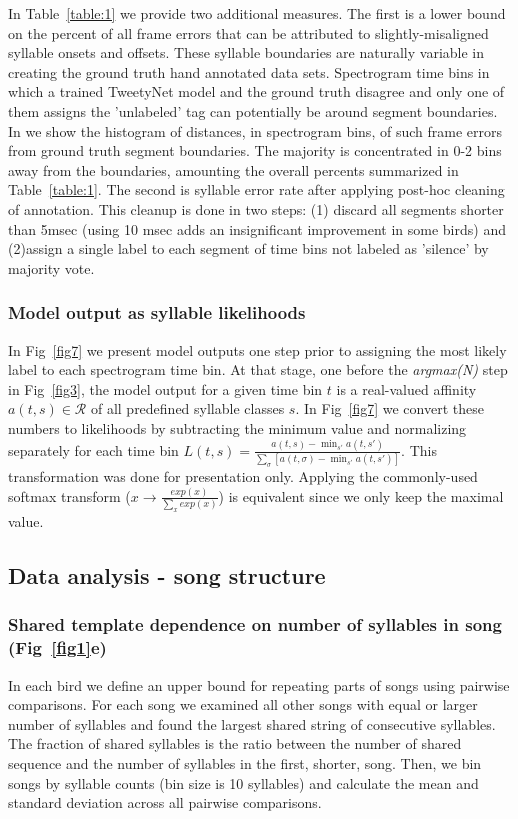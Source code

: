\documentclass[10pt,letterpaper]{article}
\begin{document}
In Table~\ref{table:1} we provide two additional measures. The first is a lower bound on the percent of all frame errors that can be attributed to slightly-misaligned syllable onsets and offsets. 
These syllable boundaries are naturally variable in creating the ground truth hand annotated data sets. Spectrogram time bins in which a trained TweetyNet model and the ground truth disagree and only one of them assigns the 'unlabeled' tag can potentially be around segment boundaries. In  we show the histogram of distances, in spectrogram bins, of such frame errors from ground truth segment boundaries. The majority is concentrated in 0-2 bins away from the boundaries, amounting the overall percents summarized in Table~\ref{table:1}. The second is syllable error rate after applying post-hoc cleaning of annotation. This cleanup is done in two steps: (1) discard all segments shorter than 5msec (using 10 msec adds an insignificant improvement in some birds) and (2)assign a single label to each segment of time bins not labeled as 'silence' by majority vote.

\subsubsection*{Model output as syllable likelihoods}
In Fig~\ref{fig7} we present model outputs one step prior to assigning the most likely label to each spectrogram time bin. At that stage, one before the \textit{argmax(N)} step in Fig~\ref{fig3}, the model output for a given time bin $t$ is a real-valued affinity $a(t,s)\in\mathcal{R}$ of all predefined syllable classes $s$. In Fig~\ref{fig7} we convert these numbers to likelihoods by subtracting the minimum value and normalizing separately for each time bin $L(t,s)=\frac{a(t,s)-\min_{s'}a(t,s')}{\sum_{\sigma}[a(t,\sigma)-\min_{s'}a(t,s')]}$. This transformation was done for presentation only. Applying the commonly-used softmax transform ($x\rightarrow\frac{exp(x)}{\sum_xexp(x)}$) is equivalent since we only keep the maximal value.

\subsection*{Data analysis - song structure} 
\subsubsection*{Shared template dependence on number of syllables in song (Fig~\ref{fig1}e)}
In each bird we define an upper bound for repeating parts of songs using pairwise comparisons. For each song we examined all other songs with equal or larger number of syllables and found the largest shared string of consecutive syllables. The fraction of shared syllables is the ratio between the number of shared sequence and the number of syllables in the first, shorter, song. Then, we bin songs by syllable counts (bin size is 10 syllables) and calculate the mean and standard deviation across all pairwise comparisons.
\end{document}
